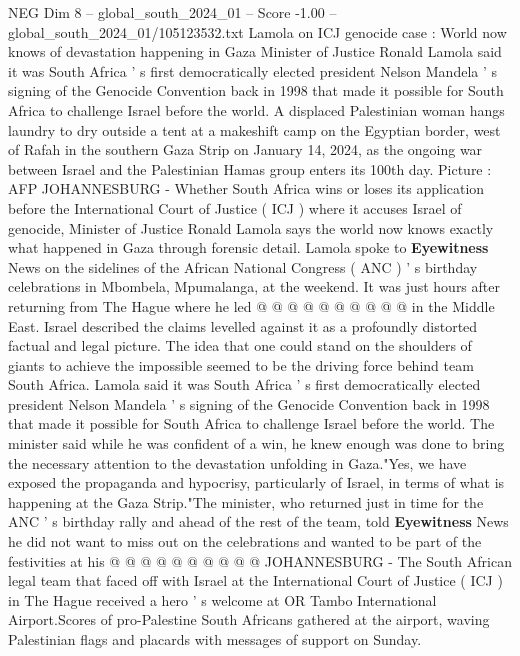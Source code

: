 \begin{textsample}{NEG Dim 8 – global\_south\_2024\_01 – Score -1.00 – global\_south\_2024\_01/105123532.txt}  \label{ex:f8_neg_171}
Lamola on ICJ genocide case : World now knows of devastation happening in Gaza Minister of Justice Ronald Lamola said it was South Africa ' s first democratically elected president Nelson Mandela ' s signing of the Genocide Convention back in 1998 that made it possible for South Africa to challenge Israel before the world.
A displaced Palestinian woman hangs laundry to dry outside a tent at a makeshift camp on the Egyptian border, west of Rafah in the southern Gaza Strip on January 14, 2024, as the ongoing war between Israel and the Palestinian Hamas group enters its 100th day.
Picture : AFP JOHANNESBURG - Whether South Africa wins or loses its application before the International Court of Justice ( ICJ ) where it accuses Israel of genocide, Minister of Justice Ronald Lamola says the world now knows exactly what happened in Gaza through forensic detail.
Lamola spoke to \textbf{Eyewitness} News on the sidelines of the African National Congress ( ANC ) ' s birthday celebrations in Mbombela, Mpumalanga, at the weekend.
It was just hours after returning from The Hague where he led @ @ @ @ @ @ @ @ @ @ in the Middle East.
Israel described the claims levelled against it as a profoundly distorted factual and legal picture.
The idea that one could stand on the shoulders of giants to achieve the impossible seemed to be the driving force behind team South Africa.
Lamola said it was South Africa ' s first democratically elected president Nelson Mandela ' s signing of the Genocide Convention back in 1998 that made it possible for South Africa to challenge Israel before the world.
The minister said while he was confident of a win, he knew enough was done to bring the necessary attention to the devastation unfolding in Gaza."Yes, we have exposed the propaganda and hypocrisy, particularly of Israel, in terms of what is happening at the Gaza Strip."The minister, who returned just in time for the ANC ' s birthday rally and ahead of the rest of the team, told \textbf{Eyewitness} News he did not want to miss out on the celebrations and wanted to be part of the festivities at his @ @ @ @ @ @ @ @ @ @ JOHANNESBURG - The South African legal team that faced off with Israel at the International Court of Justice ( ICJ ) in The Hague received a hero ' s welcome at OR Tambo International Airport.Scores of pro-Palestine South Africans gathered at the airport, waving Palestinian flags and placards with messages of support on Sunday.

\end{textsample}
